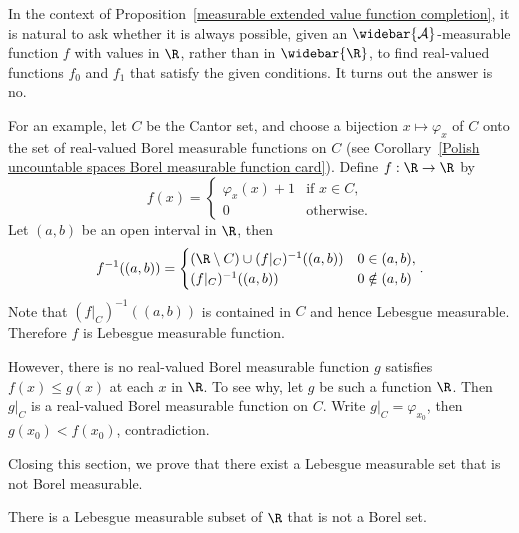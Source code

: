 \begin{remark}
In the context of Proposition~\ref{measurable extended value function completion}, it is natural to ask whether it is always possible, given an $\widebar{\mathcal{A}}$-measurable function $f$ with values in $\R$, rather than in $\widebar{\R}$, to find real-valued functions $f_0$ and $f_1$ that satisfy the given conditions. It turns out the answer is no.\par
For an example, let $C$ be the Cantor set, and choose a bijection $x\mapsto\varphi_x$ of $C$ onto the set of real-valued Borel measurable functions on $C$ (see Corollary~\ref{Polish uncountable spaces Borel measurable function card}). Define $f:\R\to\R$ by
\[f(x)=\begin{cases}
\varphi_x(x)+1&\text{if $x\in C$},\\
0&\text{otherwise}.
\end{cases}\]
Let $(a,b)$ be an open interval in $\R$, then
\[f^{-1}((a,b))=\begin{cases}
(\R\setminus C)\cup(f|_C)^{-1}((a,b))&0\in(a,b),\\
(f|_C)^{-1}((a,b))&0\notin(a,b)
\end{cases}.\]
Note that $(f|_C)^{-1}((a,b))$ is contained in $C$ and hence Lebesgue measurable. Therefore $f$ is Lebesgue measurable function.\par
However, there is no real-valued Borel measurable function $g$ satisfies $f(x)\leq g(x)$ at each $x$ in $\R$. To see why, let $g$ be such a function $\R$. Then $g|_C$ is a real-valued Borel measurable function on $C$. Write $g|_C=\varphi_{x_0}$, then $g(x_0)<f(x_0)$, contradiction.
\end{remark}
Closing this section, we prove that there exist a Lebesgue measurable set that is not Borel measurable.
\begin{proposition}\label{Lebesgue measurable not Borel}
There is a Lebesgue measurable subset of $\R$ that is not a Borel set.
\end{proposition}
